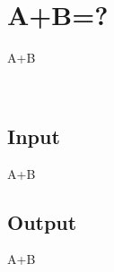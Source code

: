 \documentclass{article}
\begin{document}
\section*{A+B=?}

A+B\\

\strut \\



\subsection*{Input}
A+B



\subsection*{Output}
A+B
\end{document}
